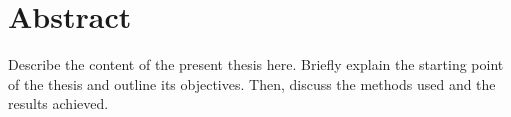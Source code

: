 \chapter*{Abstract}


Describe the content of the present thesis here. Briefly explain the starting point of the thesis and outline its objectives. 
Then, discuss the methods used and the results achieved.
